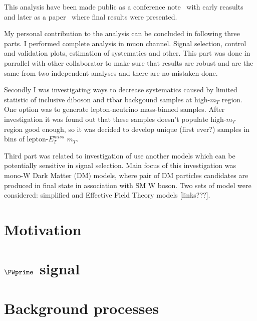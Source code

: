 This analysis have been made public as a conference note~\cite{ATLAS-CONF-2015-063} with early reasults and later as a paper~\cite{Aaboud:2016zkn} where final results were presented.

My personal contribution to the analysis can be concluded in following three parts.
I performed complete analysis in muon channel. Signal selection, control and validation plots, estimation of systematics and other.
This part was done in parrallel with other collaborator to make sure that results are robust and are the same from two independent analyses and there are no mistaken done.

Secondly I was investigating ways to decrease systematics caused by limited statistic of inclusive diboson and ttbar backgound samples at high-$m_{T}$ region.
One option was to generate lepton-neutrino mass-binned samples. After investigation it was found out that these samples doesn't populate high-$m_{T}$ region
good enough, so it was decided to develop unique (first ever?) samples in bins of lepton-$E_T^{miss} $ $m_T$.

Third part was related to investigation of use another models which can be potentially sensitive in signal selection.
Main focus of this investigation was mono-W Dark Matter (DM) models, where pair of DM particles candidates are produced in final state in association with SM W boson.
Two sets of model were considered: simplified and Effective Field Theory models [links???]. 


\section{Motivation}
\label{sec:wprimeIntro}



\section{$\PWprime$ signal}
\label{sec:wprimeSignal} 

\section{Background processes}
\label{sec:wprimeBackgrounds}


